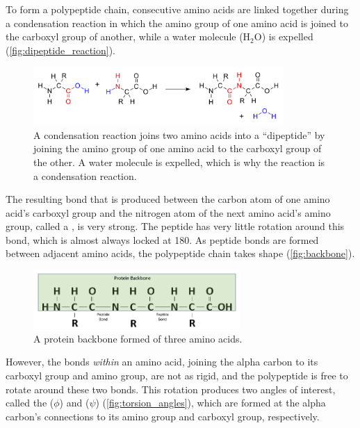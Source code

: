 To form a polypeptide chain, consecutive amino acids are linked together during a condensation reaction in which the amino group of one amino acid is joined to the carboxyl group of another, while a water molecule ($\text{H}_2\text{O}$) is expelled (\autoref{fig:dipeptide_reaction}).\\

\begin{figure}[h]
	\centering
	\mySfFamily
	\includegraphics[width = 0.85\textwidth]{../images/dipeptide_reaction.png}
	\caption{A condensation reaction joins two amino acids into a ``dipeptide'' by joining the amino group of one amino acid to the carboxyl group of the other. A water molecule is expelled, which is why the reaction is a condensation reaction.}
	\label{fig:dipeptide_reaction}
\end{figure}

The resulting bond that is produced between the carbon atom of one amino acid's carboxyl group and the nitrogen atom of the next amino acid's amino group, called a , is very strong. The peptide has very little rotation around this bond, which is almost always locked at 180\textdegree. As peptide bonds are formed between adjacent amino acids, the polypeptide chain takes shape (\autoref{fig:backbone}).\\

\begin{figure}[h]
	\centering
	\mySfFamily
	\includegraphics[width = 0.7\textwidth]{../images/Backbone.png}
	\caption{A protein backbone formed of three amino acids.}
	\label{fig:backbone}
\end{figure}

However, the bonds \textit{within} an amino acid, joining the alpha carbon to its carboxyl group and amino group, are not as rigid, and the polypeptide is free to rotate around these two bonds. This rotation produces two angles of interest, called the  ($\phi$) and  ($\psi$) (\autoref{fig:torsion_angles}), which are formed at the alpha carbon's connections to its amino group and carboxyl group, respectively.

